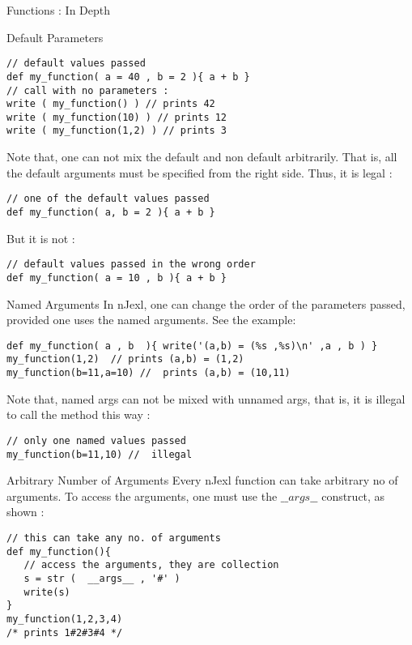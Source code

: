 \begin{section}{Functions : In Depth}
\begin{subsection}{Default Parameters}
\begin{lstlisting}[style=JexlStyle]
// default values passed 
def my_function( a = 40 , b = 2 ){ a + b }
// call with no parameters :
write ( my_function() ) // prints 42 
write ( my_function(10) ) // prints 12 
write ( my_function(1,2) ) // prints 3 
\end{lstlisting}
Note that, one can not mix the default and non default arbitrarily.
That is, all the default arguments must be specified from the right side.
Thus, it is legal :
\begin{lstlisting}[style=JexlStyle]
// one of the default values passed 
def my_function( a, b = 2 ){ a + b }
\end{lstlisting}
But it is not :
\begin{lstlisting}[style=JexlStyle]
// default values passed in the wrong order
def my_function( a = 10 , b ){ a + b }
\end{lstlisting}
\end{subsection}

\begin{subsection}{Named Arguments}
In nJexl, one can change the order of the parameters passed, 
provided one uses the named arguments.
See the example:

\begin{lstlisting}[style=JexlStyle]
def my_function( a , b  ){ write('(a,b) = (%s ,%s)\n' ,a , b ) }
my_function(1,2)  // prints (a,b) = (1,2) 
my_function(b=11,a=10) //  prints (a,b) = (10,11) 
\end{lstlisting}
Note that, named args can not be mixed with unnamed args,
that is, it is illegal to call the method this way :

\begin{lstlisting}[style=JexlStyle]
// only one named values passed 
my_function(b=11,10) //  illegal 
\end{lstlisting}

\end{subsection}


\begin{subsection}{Arbitrary Number of Arguments}
Every nJexl function can take arbitrary no of arguments.
To access the arguments, one must use the $\_\_args\_\_$ construct, as shown :

\begin{center}\begin{minipage}{\linewidth}
\begin{lstlisting}[style=JexlStyle]
// this can take any no. of arguments 
def my_function(){ 
   // access the arguments, they are collection  
   s = str (  __args__ , '#' )
   write(s)  
}
my_function(1,2,3,4)
/* prints 1#2#3#4 */
\end{lstlisting}
\end{minipage}\end{center}



\end{subsection}
\end{section}
